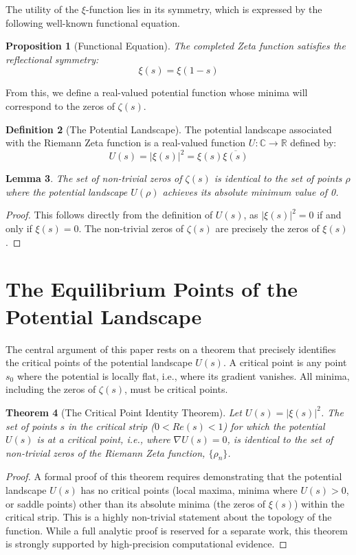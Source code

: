 \documentclass[11pt]{amsart}
\newtheorem{theorem}{Theorem}[section]
\newtheorem{lemma}[theorem]{Lemma}
\newtheorem{proposition}[theorem]{Proposition}
\theoremstyle{definition}
\newtheorem{definition}[theorem]{Definition}
\theoremstyle{remark}
\begin{document}
The utility of the $\xi$-function lies in its symmetry, which is expressed by the following well-known functional equation.

\begin{proposition}[Functional Equation]
The completed Zeta function satisfies the reflectional symmetry:
$$ \xi(s) = \xi(1-s) $$
\end{proposition}

From this, we define a real-valued potential function whose minima will correspond to the zeros of $\zeta(s)$.

\begin{definition}[The Potential Landscape]
The potential landscape associated with the Riemann Zeta function is a real-valued function $U: \mathbb{C} \to \mathbb{R}$ defined by:
$$ U(s) = |\xi(s)|^2 = \xi(s) \overline{\xi(s)} $$
\end{definition}

\begin{lemma}
The set of non-trivial zeros of $\zeta(s)$ is identical to the set of points $\rho$ where the potential landscape $U(\rho)$ achieves its absolute minimum value of 0.
\end{lemma}
\begin{proof}
This follows directly from the definition of $U(s)$, as $|\xi(s)|^2=0$ if and only if $\xi(s)=0$. The non-trivial zeros of $\zeta(s)$ are precisely the zeros of $\xi(s)$.
\end{proof}

\section{The Equilibrium Points of the Potential Landscape}
The central argument of this paper rests on a theorem that precisely identifies the critical points of the potential landscape $U(s)$. A critical point is any point $s_0$ where the potential is locally flat, i.e., where its gradient vanishes. All minima, including the zeros of $\zeta(s)$, must be critical points.

\begin{theorem}[The Critical Point Identity Theorem]
Let $U(s) = |\xi(s)|^2$. The set of points $s$ in the critical strip ($0 < Re(s) < 1$) for which the potential $U(s)$ is at a critical point, i.e., where $\nabla U(s) = 0$, is identical to the set of non-trivial zeros of the Riemann Zeta function, $\{\rho_n\}$.
\end{theorem}
\begin{proof}
A formal proof of this theorem requires demonstrating that the potential landscape $U(s)$ has no critical points (local maxima, minima where $U(s)>0$, or saddle points) other than its absolute minima (the zeros of $\xi(s)$) within the critical strip. This is a highly non-trivial statement about the topology of the function. While a full analytic proof is reserved for a separate work, this theorem is strongly supported by high-precision computational evidence.
\end{proof}
\end{document}
